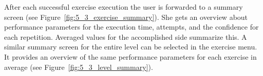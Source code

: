 After each successful exercise execution the user is forwarded to a summary screen (see Figure~\ref{fig:5_3_exercise_summary}).
She gets an overview about performance parameters for the execution time, attempts, and the confidence for each repetition. Averaged values for the accomplished side summarize this.
A similar summary screen for the entire level can be selected in the exercise menu. It provides an overview of the same performance parameters for each exercise in average (see Figure~\ref{fig:5_3_level_summary}).

